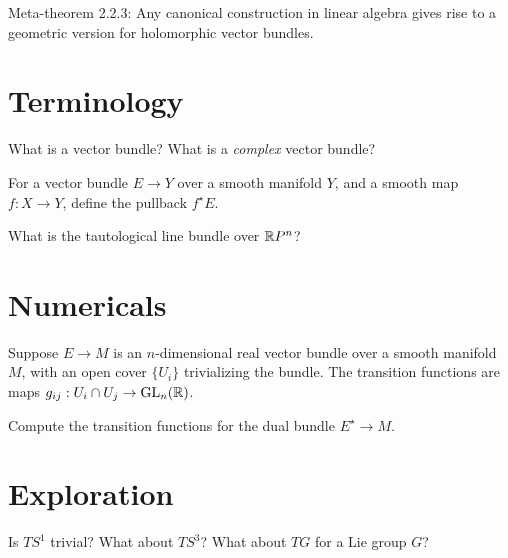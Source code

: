 \documentclass{homework}
\author{Jim Fowler}
\DeclareMathOperator{\GL}{GL}
\begin{document}
\maketitle

\begin{inspiration}
  Meta-theorem 2.2.3: Any canonical construction in linear algebra gives rise to a geometric version for holomorphic vector bundles. 
\end{inspiration}

\section{Terminology}

\begin{problem}
  What is a vector bundle?  What is a \textit{complex} vector bundle?
\end{problem}

\begin{problem}
 For a vector bundle $E \to Y$ over a smooth manifold $Y$, and a smooth map $f : X \to Y$, define the pullback $f^\star E$.
\end{problem}

\begin{problem}
  What is the tautological line bundle over $\mathbb{R}P^n$?
\end{problem}

\section{Numericals}

\begin{problem} Suppose $E \to M$ is an $n$-dimensional real vector
bundle over a smooth manifold $M$, with an open cover $\{U_i\}$
trivializing the bundle.  The transition functions are maps $g_{ij} :
U_i \cap U_j \to \GL_n(\R)$.

  Compute the transition functions for the dual bundle $E^\star \to M$.
\end{problem}

\section{Exploration}

\begin{problem}
  Is $TS^1$ trivial?  What about $TS^3$?  What about $TG$ for a Lie group $G$?
\end{problem}
\end{document}
